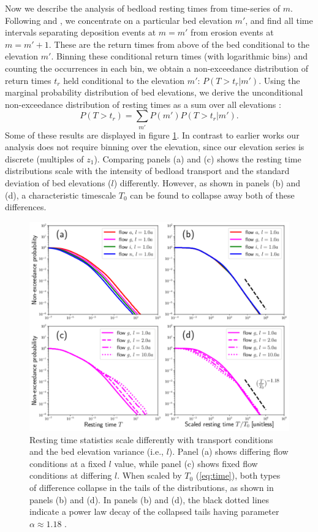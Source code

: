 \documentclass[draft]{agujournal2018}
\newcommand\be{\begin{equation}} %
\newcommand\ee{\end{equation}}   %
\begin{document}
Now we describe the analysis of bedload resting times from time-series of $m$.
Following \citet{Voepel2013} and \citet{Martin2014}, we concentrate on a particular bed elevation $m'$, and find all time intervals separating deposition events at $m=m'$ from erosion events at $m=m'+1$.
These are the return times from above of the bed conditional to the elevation $m'$.
Binning these conditional return times (with logarithmic bins) and counting the occurrences in each bin, we obtain a non-exceedance distribution of return times $t_r$ held conditional to the elevation $m'$: $P(T>t_r|m')$.
Using the marginal probability distribution of bed elevations, we derive the unconditional non-exceedance distribution of resting times as a sum over all elevations \citep{Yang1971, Nakagawa1980, Voepel2013, Martin2014}:
\be P(T>t_r) = \sum_{m'} P(m') P(T>t_r|m') .\ee
Some of these results are displayed in figure \ref{fig:cdfs}.
In contrast to earlier works our analysis does not require binning over the elevation, since our elevation series is discrete (multiples of $z_1$).
Comparing panels (a) and (c) shows the resting time distributions scale with the intensity of bedload transport and the standard deviation of bed elevations ($l$) differently.
However, as shown in panels (b) and (d), a characteristic timescale $T_0$ can be found to collapse away both of these differences.
\begin{figure}[t!]
	\includegraphics[width=\linewidth,keepaspectratio]{./figures/montage1.pdf}
	\caption{Resting time statistics scale differently with transport conditions and the bed elevation variance (i.e., $l$). Panel (a) shows differing flow conditions at a fixed $l$ value, while panel (c) shows fixed flow conditions at differing $l$. When scaled by $T_0$ (\ref{eq:time}), both types of difference collapse in the tails of the distributions, as shown in panels (b) and (d). In panels (b) and (d), the black dotted lines indicate a power law decay of the collapsed tails having parameter $\alpha\approx1.18$ .}
	\label{fig:cdfs}
\end{figure}
\end{document}
